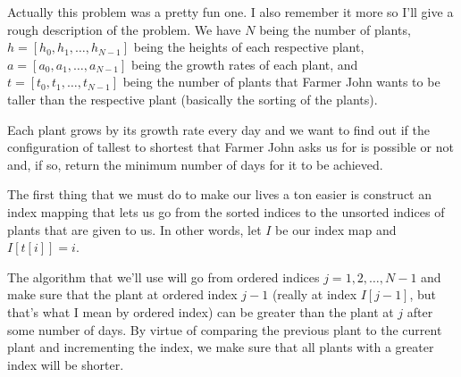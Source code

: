 \documentclass[12pt]{article}
\begin{document}
\begin{problemnum}
    Actually this problem was a pretty fun one. I also remember it more so I'll
    give a rough description of the problem. We have \( N \) being the number
    of plants, \( h = [h_0, h_1, \ldots, h_{N-1}] \) being the heights of each
    respective plant, \( a = [a_0, a_1, \ldots, a_{N-1}] \) being the growth
    rates of each plant, and \( t = [t_0, t_1, \ldots, t_{N-1}] \) being the
    number of plants that Farmer John wants to be taller than the respective
    plant (basically the sorting of the plants).

    Each plant grows by its growth rate every day and we want to find out if
    the configuration of tallest to shortest that Farmer John asks us for is
    possible or not and, if so, return the minimum number of days for it to
    be achieved.

    The first thing that we must do to make our lives a ton easier is construct
    an index mapping that lets us go from the sorted indices to the unsorted
    indices of plants that are given to us. In other words, let \( I \) be our
    index map and \( I[t[i]] = i \).

    The algorithm that we'll use will go from ordered indices \(
    j=1,2,\ldots,N-1 \) and make sure that the plant at ordered index \( j-1 \)
    (really at index \( I[j-1] \), but that's what I mean by ordered index) can
    be greater than the plant at \( j \) after some number of days. By virtue
    of comparing the previous plant to the current plant and incrementing the
    index, we make sure that all plants with a greater index will be shorter.


\end{problemnum}
\end{document}
